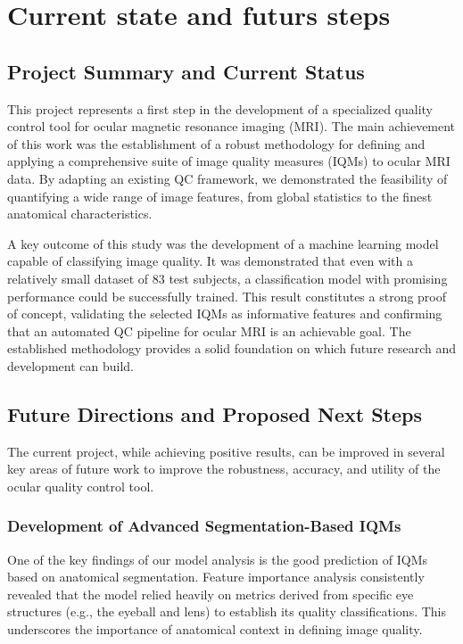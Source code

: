 \chapter{Current state and futurs steps}
\label{chap:curr_stat}
\section{Project Summary and Current Status}
This project represents a first step in the development of a specialized quality control tool for ocular magnetic resonance imaging (MRI). The main achievement of this work was the establishment of a robust methodology for defining and applying a comprehensive suite of image quality measures (IQMs) to ocular MRI data. By adapting an existing QC framework, we demonstrated the feasibility of quantifying a wide range of image features, from global statistics to the finest anatomical characteristics.

A key outcome of this study was the development of a machine learning model capable of classifying image quality. It was demonstrated that even with a relatively small dataset of 83 test subjects, a classification model with promising performance could be successfully trained. This result constitutes a strong proof of concept, validating the selected IQMs as informative features and confirming that an automated QC pipeline for ocular MRI is an achievable goal. The established methodology provides a solid foundation on which future research and development can build.


\section{Future Directions and Proposed Next Steps}
The current project, while achieving positive results, can be improved in several key areas of future work to improve the robustness, accuracy, and utility of the ocular quality control tool.

\subsection{Development of Advanced Segmentation-Based IQMs}
One of the key findings of our model analysis is the good prediction of IQMs based on anatomical segmentation. Feature importance analysis consistently revealed that the model relied heavily on metrics derived from specific eye structures (e.g., the eyeball and lens) to establish its quality classifications. This underscores the importance of anatomical context in defining image quality.

